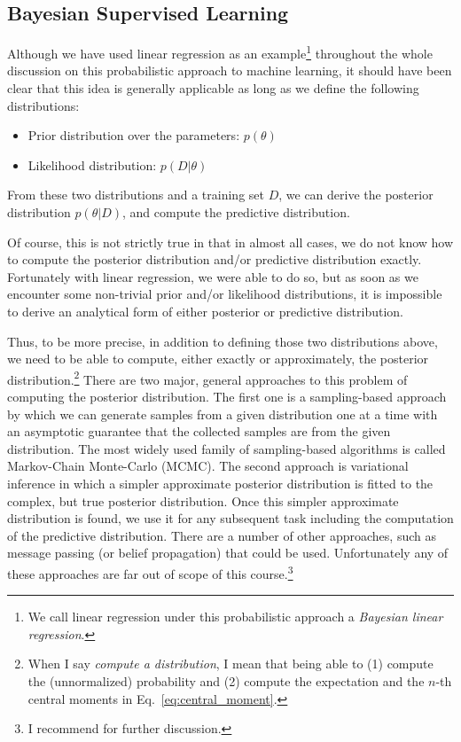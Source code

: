 \documentclass{report}
\begin{document}
\subsection{Bayesian Supervised Learning}

Although we have used linear regression as an example\footnote{
    We call linear regression under this probabilistic approach a {\it Bayesian
    linear regression}.
}
throughout the whole discussion on this probabilistic approach to machine
learning, it should have been clear that this idea is generally applicable as
long as we define the following distributions:
\begin{itemize}
    \item Prior distribution over the parameters: $p(\theta)$
    \item Likelihood distribution: $p(D|\theta)$
\end{itemize}
From these two distributions and a training set $D$, we can derive the posterior
distribution $p(\theta | D)$, and compute the predictive distribution. 

Of course, this is not strictly true in that in almost all cases, we do not know
how to compute the posterior distribution and/or predictive distribution
exactly. Fortunately with linear regression, we were able to do so, but as soon
as we encounter some non-trivial prior and/or likelihood distributions, it is
impossible to derive an analytical form of either posterior or predictive
distribution. 

Thus, to be more precise, in addition to defining those two distributions above,
we need to be able to compute, either exactly or approximately, the posterior
distribution.\footnote{
    When I say {\it compute a distribution}, I mean that being able to (1)
    compute the (unnormalized) probability and (2) compute the expectation and
    the $n$-th central moments in Eq.~\eqref{eq:central_moment}.
} There are two major, general approaches to this problem of computing the
posterior distribution. The first one is a sampling-based approach by which we
can generate samples from a given distribution one at a time with an asymptotic
guarantee that the collected samples are from the given distribution. The most
widely used family of sampling-based algorithms is called Markov-Chain
Monte-Carlo (MCMC). The second approach is variational inference in which a
simpler approximate posterior distribution is fitted to the complex, but true
posterior distribution. Once this simpler approximate distribution is found, we
use it for any subsequent task including the computation of the predictive
distribution. There are a number of other approaches, such as message passing
(or belief propagation) that could be used. Unfortunately any of these
approaches are far out of scope of this course.\footnote{
    I recommend \cite{bishop2006pattern} for further discussion.
}
\end{document}
